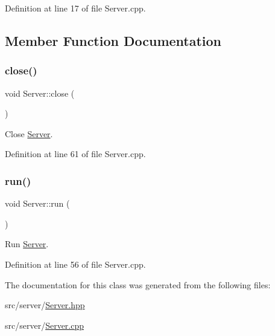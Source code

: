 Definition at line 17 of file Server.\+cpp.



\subsection{Member Function Documentation}
\mbox{\label{class_zia_1_1_server_ad1a4b1650214d156491a98ff6b96d787}} 
\subsubsection{\texorpdfstring{close()}{close()}}
{\footnotesize\ttfamily void Server\+::close (\begin{DoxyParamCaption}{ }\end{DoxyParamCaption})}



Close \hyperlink{class_zia_1_1_server}{Server}. 



Definition at line 61 of file Server.\+cpp.

\mbox{\label{class_zia_1_1_server_abb27d30b40a94326e3fd629d3b30b7d5}} 
\subsubsection{\texorpdfstring{run()}{run()}}
{\footnotesize\ttfamily void Server\+::run (\begin{DoxyParamCaption}{ }\end{DoxyParamCaption})}



Run \hyperlink{class_zia_1_1_server}{Server}. 



Definition at line 56 of file Server.\+cpp.



The documentation for this class was generated from the following files\+:\begin{DoxyCompactItemize}
\item 
src/server/\hyperlink{_server_8hpp}{Server.\+hpp}\item 
src/server/\hyperlink{_server_8cpp}{Server.\+cpp}\end{DoxyCompactItemize}
